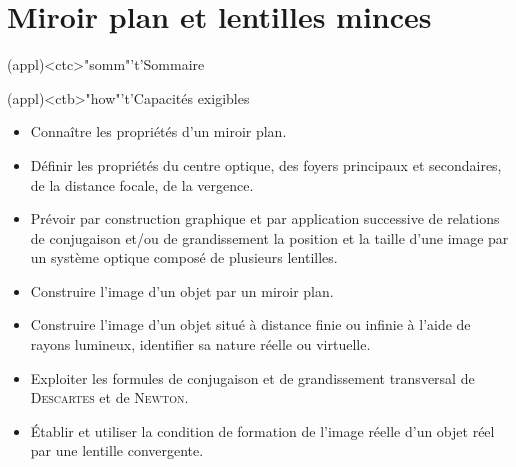 \documentclass[../../main/main.tex]{subfiles}
\begin{document}
\setcounter{chapter}{2}


\chapter{Miroir plan et lentilles minces}

\vspace*{\fill}

\begin{tcn}(appl)<ctc>"somm"'t'{Sommaire}
	\let\item\olditem
	\vspace{-15pt}
	\minitoc
	\vspace{-25pt}
\end{tcn}

\begin{tcn}[sidebyside](appl)<ctb>"how"'t'{Capacités exigibles}
	\begin{itemize}[label=\rcheck]
		\item Connaître les propriétés d'un miroir plan.
		\item Définir les propriétés du centre optique, des foyers principaux et
		      secondaires, de la distance focale, de la vergence.
		\item Prévoir par construction graphique et par application successive de
		      relations de conjugaison et/ou de grandissement la position et la
		      taille d'une image par un système optique composé de plusieurs
		      lentilles.
	\end{itemize}
	\tcblower
	\begin{itemize}[label=\rcheck]
		\item Construire l'image d’un objet par un miroir plan.
		\item Construire l'image d’un objet situé à distance finie ou infinie à
		      l'aide de rayons lumineux, identifier sa nature réelle ou virtuelle.
		\item Exploiter les formules de conjugaison et de grandissement transversal
		      de \textsc{Descartes} et de \textsc{Newton}.
		\item Établir et utiliser la condition de formation de l'image réelle d’un
		      objet réel par une lentille convergente.
	\end{itemize}
\end{tcn}

\vspace*{\fill}
\newpage
\vspace*{\fill}
\end{document}
